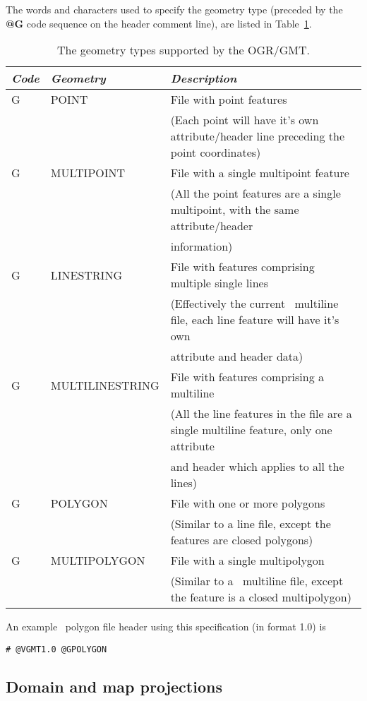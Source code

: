 The words and characters used to specify the geometry type
(preceded by the \textbf{@G} code sequence on
the header comment line), are listed in Table~\ref{tbl:geometries}.
\begin{table}[h]
\small
\centering
\begin{tabular}{|l|l|l|} \hline
\emph{Code}	&	\emph{Geometry}	&	\emph{Description} \\ \hline \hline
G	&	POINT		&	File with point features \\
	&			&	(Each point will have it's own attribute/header line preceding the point coordinates) \\ \hline
G	&	MULTIPOINT	&	File with a single multipoint feature \\
	&			&	(All the point features are a single multipoint, with the same attribute/header \\
	&			&	information) \\ \hline
G	&	LINESTRING	&	File with features comprising multiple single lines  \\
	&			&	(Effectively the current \GMT\ multiline file, each line feature will have it's own  \\ 
	&			&	attribute and header data) \\ \hline
G	&	MULTILINESTRING	&	File with features comprising a multiline \\
	&			&	(All the line features in the file are a single multiline feature, only one attribute\\
	&			&	and header which applies to all the lines) \\ \hline
G	&	POLYGON		&	File with one or more polygons \\
	&			&	(Similar to a line file, except the features are closed polygons) \\ \hline
G	&	MULTIPOLYGON	&	File with a single multipolygon \\
	&			&	(Similar to a \GMT\ multiline file, except the feature is a closed multipolygon) \\ \hline
\end{tabular}
\label{tbl:geometries}
\caption{The geometry types supported by the OGR/GMT.}
\end{table} 
An example \GMT\ polygon file header using this specification (in format 1.0) is

\begin{verbatim}
# @VGMT1.0 @GPOLYGON
\end{verbatim}

\subsection{Domain and map projections}

